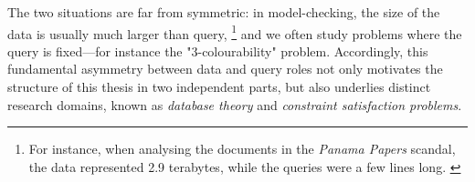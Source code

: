 The two situations are far from symmetric: in model-checking, the size of the
data is usually much larger than query,%
\footnote{For instance, when analysing the documents in the \emph{Panama Papers} scandal,
the data represented 2.9 terabytes, while the queries were a few lines long. \cite{Neo4jPanama}}
and we often study problems where
the query is fixed---for instance the "$3$-colourability" problem.
Accordingly, this fundamental asymmetry between data and query roles not only motivates the structure of this thesis in two independent parts, but also underlies distinct research domains, known as \emph{database theory} and \emph{constraint satisfaction problems}.


